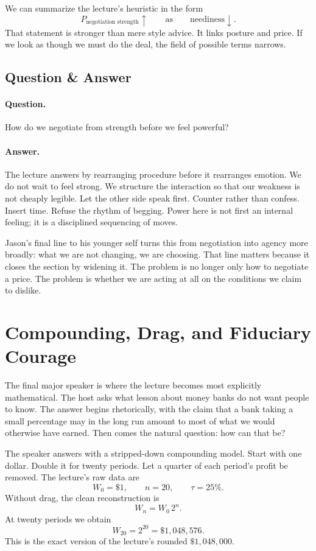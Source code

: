 We can summarize the lecture's heuristic in the form
\begin{equation}
P_{\text{negotiation strength}}\uparrow
\qquad\text{as}\qquad
\text{neediness}\downarrow.
\end{equation}
That statement is stronger than mere style advice. It links posture and price. If we look as though we must do the deal, the field of possible terms narrows.

\subsection{Question \& Answer}

\paragraph{Question.}
How do we negotiate from strength before we feel powerful?

\paragraph{Answer.}
The lecture answers by rearranging procedure before it rearranges emotion. We do not wait to feel strong. We structure the interaction so that our weakness is not cheaply legible. Let the other side speak first. Counter rather than confess. Insert time. Refuse the rhythm of begging. Power here is not first an internal feeling; it is a disciplined sequencing of moves.

Jason's final line to his younger self turns this from negotiation into agency more broadly: what we are not changing, we are choosing. That line matters because it closes the section by widening it. The problem is no longer only how to negotiate a price. The problem is whether we are acting at all on the conditions we claim to dislike.

\section{Compounding, Drag, and Fiduciary Courage}

The final major speaker is where the lecture becomes most explicitly mathematical. The host asks what lesson about money banks do not want people to know. The answer begins rhetorically, with the claim that a bank taking a small percentage may in the long run amount to most of what we would otherwise have earned. Then comes the natural question: how can that be?

The speaker answers with a stripped-down compounding model. Start with one dollar. Double it for twenty periods. Let a quarter of each period's profit be removed. The lecture's raw data are
\begin{equation}
W_0=\$1,
\qquad
n=20,
\qquad
\tau=25\%.
\end{equation}
Without drag, the clean reconstruction is
\begin{equation}
W_n=W_0\,2^n.
\end{equation}
At twenty periods we obtain
\begin{equation}
W_{20}=2^{20}=\$1{,}048{,}576.
\end{equation}
This is the exact version of the lecture's rounded \(\$1{,}048{,}000\).

